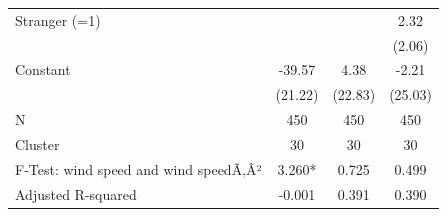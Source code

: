 {\begin{tabular}{l*{3}{c}}
Stranger (=1)       &                     &                     &        2.32         \\
                    &                     &                     &      (2.06)         \\
Constant            &      -39.57\sym{*}  &        4.38         &       -2.21         \\
                    &     (21.22)         &     (22.83)         &     (25.03)         \\
\midrule
N                   &         450         &         450         &         450         \\
Cluster             &          30         &          30         &          30         \\
F-Test: wind speed and wind speedÃ‚Â²&      3.260*         &       0.725         &       0.499         \\
Adjusted R-squared  &      -0.001         &       0.391         &       0.390         \\
\bottomrule
\end{tabular}
}
